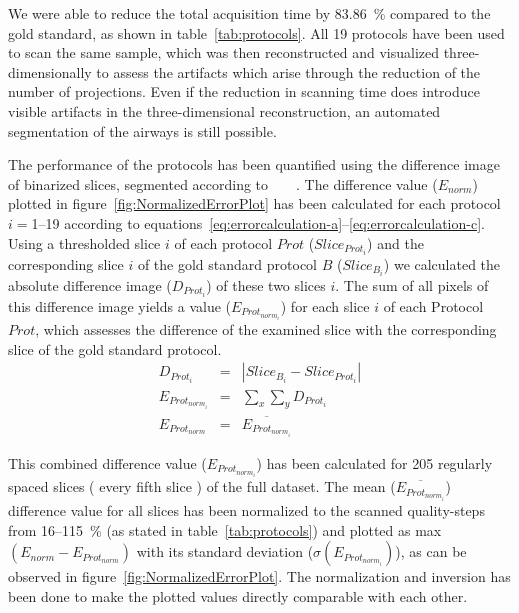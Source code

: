 We were able to reduce the total acquisition time by \SI{83.86}{\percent} compared to the gold standard, as shown in table~\ref{tab:protocols}. All 19 protocols have been used to scan the same sample, which was then reconstructed and visualized three-dimensionally to assess the artifacts which arise through the reduction of the number of projections. Even if the reduction in scanning time does introduce visible artifacts in the three-dimensional reconstruction, an automated segmentation of the airways is still possible.

The performance of the protocols has been quantified using the difference image of binarized slices, segmented according to%
\ifhtml%
	~\citet{Otsu1979}%
\else%
	~%
\fi%
. %
The difference value ($E_{norm}$) plotted in figure~\ref{fig:NormalizedErrorPlot} has been calculated for each protocol $i=$1--19 according to equations~\ref{eq:errorcalculation-a}--\ref{eq:errorcalculation-c}. Using a thresholded slice $i$ of each protocol $Prot$ ($Slice_{Prot_{i}}$) and the corresponding slice $i$ of the gold standard protocol $B$ ($Slice_{B_{i}}$) we calculated the absolute difference image ($D_{Prot_{i}}$) of these two slices $i$. The sum of all pixels of this difference image yields a value ($E_{Prot_{norm_{i}}}$) for each slice $i$ of each Protocol $Prot$, which assesses the difference of the examined slice with the corresponding slice of the gold standard protocol.
\begin{eqnarray}%
	D_{Prot_{i}} &=& |Slice_{B_{i}}-Slice_{Prot_{i}}|\label{eq:errorcalculation-a}\\%
	E_{Prot_{norm_{i}}} &=& \sum_{x}\sum_{y} D_{Prot_{i}}\label{eq:errorcalculation-b}\\%
	E_{Prot_{norm}} &=& \overline{E_{Prot_{norm_{i}}}}\label{eq:errorcalculation-c}%
\end{eqnarray}%

This combined difference value ($E_{Prot_{norm_{i}}}$) has been calculated for 205 regularly spaced slices (%
every fifth slice%
) of the full dataset. The mean ($\overline{E_{Prot_{norm_{i}}}}$) difference value for all slices has been normalized to the scanned quality-steps from 16--\SI{115}{\percent} (as stated in table~\ref{tab:protocols}) and plotted as max$(E_{norm}-E_{Prot_{norm}})$ with its standard deviation ($\sigma(E_{Prot_{norm_{i}}})$), as can be observed in figure~\ref{fig:NormalizedErrorPlot}. The normalization and inversion has been done to make the plotted values directly comparable with each other.

